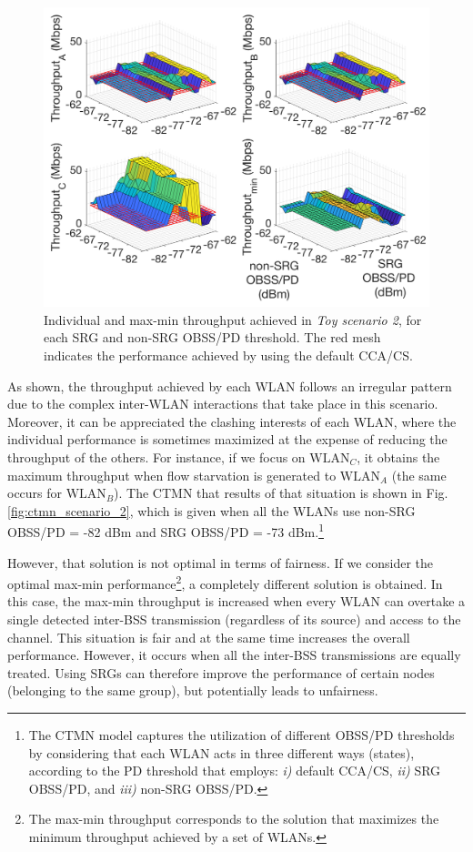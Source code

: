 \documentclass[comsoc]{IEEEtran}
\begin{document}
	\begin{figure}[ht!]
		\centering
		\includegraphics[width=\columnwidth]{SIM_1_2}
		\caption{Individual and max-min throughput achieved in \emph{Toy scenario 2}, for each SRG and non-SRG OBSS/PD threshold. The red mesh indicates the performance achieved by using the default CCA/CS.}
		\label{fig:SIM_1_3_individual}
	\end{figure}
	
	As shown, the throughput achieved by each WLAN follows an irregular pattern due to the complex inter-WLAN interactions that take place in this scenario. Moreover, it can be appreciated the clashing interests of each WLAN, where the individual performance is sometimes maximized at the expense of reducing the throughput of the others. For instance, if we focus on $\text{WLAN}_C$, it obtains the maximum throughput when flow starvation is generated to $\text{WLAN}_A$ (the same occurs for $\text{WLAN}_B$). The CTMN that results of that situation is shown in Fig. \ref{fig:ctmn_scenario_2}, which is given when all the WLANs use non-SRG OBSS/PD = -82 dBm and SRG OBSS/PD = -73 dBm.\footnote{The CTMN model captures the utilization of different OBSS/PD thresholds by considering that each WLAN acts in three different ways (states), according to the PD threshold that employs: \emph{i)} default CCA/CS, \emph{ii)} SRG OBSS/PD, and \emph{iii)} non-SRG OBSS/PD.}
	
	However, that solution is not optimal in terms of fairness. If we consider the optimal max-min performance\footnote{The max-min throughput corresponds to the solution that maximizes the minimum throughput achieved by a set of WLANs.}, a completely different solution is obtained. In this case, the max-min throughput is increased when every WLAN can overtake a single detected inter-BSS transmission (regardless of its source) and access to the channel. This situation is fair and at the same time increases the overall performance. However, it occurs when all the inter-BSS transmissions are equally treated. Using SRGs can therefore improve the performance of certain nodes (belonging to the same group), but potentially leads to unfairness. 
	
\end{document}
